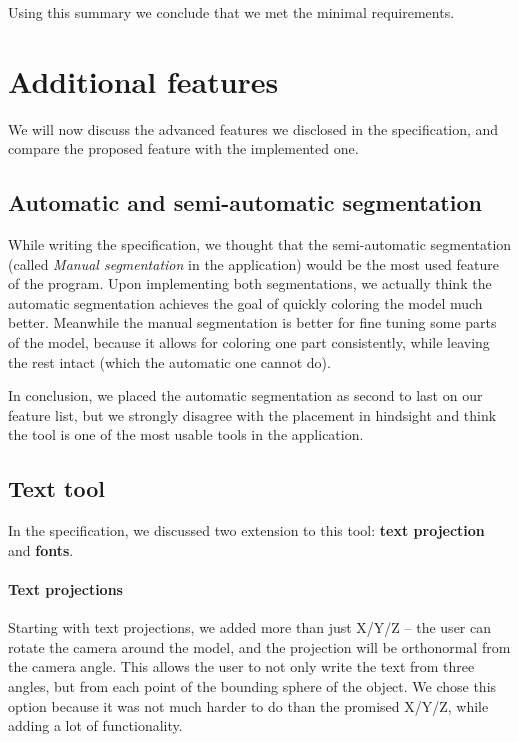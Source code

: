 Using this summary we conclude that we met the minimal requirements.

\section{Additional features}
\label{sec:features}

We will now discuss the advanced features we disclosed in the specification, and compare the proposed feature with the implemented one.

\subsection{Automatic and semi-automatic segmentation}

While writing the specification, we thought that the semi-automatic segmentation (called \textit{Manual segmentation} in the application) would be the most used feature of the program. Upon implementing both segmentations, we actually think the automatic segmentation achieves the goal of quickly coloring the model much better. Meanwhile the manual segmentation is better for fine tuning some parts of the model, because it allows for coloring one part consistently, while leaving the rest intact (which the automatic one cannot do).

In conclusion, we placed the automatic segmentation as second to last on our feature list, but we strongly disagree with the placement in hindsight and think the tool is one of the most usable tools in the application.

\subsection{Text tool}

In the specification, we discussed two extension to this tool: \textbf{text projection} and \textbf{fonts}.

\paragraph{Text projections}

Starting with text projections, we added more than just X/Y/Z -- the user can rotate the camera around the model, and the projection will be orthonormal from the camera angle. This allows the user to not only write the text from three angles, but from each point of the bounding sphere of the object. We chose this option because it was not much harder to do than the promised X/Y/Z, while adding a lot of functionality.

